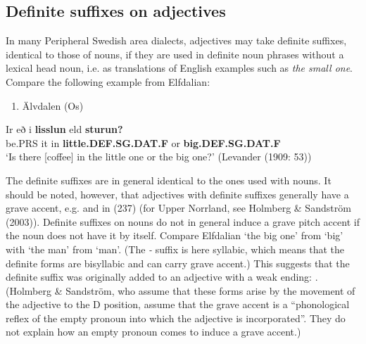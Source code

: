 \subsection[Definite suffixes on adjectives]{\rmfamily Definite suffixes on adjectives}
\label{bkm:Ref155519944}%
In many Peripheral Swedish area dialects, adjectives may take definite suffixes, identical to those of nouns, if they are used in definite noun phrases without a lexical head noun, i.e. as translations of English examples such as \textit{the small one}. Compare the following example from Elfdalian:

\begin{enumerate} %
\item 
\label{bkm:Ref78439135}Älvdalen (Os)

\end{enumerate} %
\ea\label{}
\gll Ir  eð  i  \textbf{lisslun} eld  \textbf{sturun?}\\


be.PRS  it  in  \textbf{little.DEF.SG.DAT.F} or  \textbf{big.DEF.SG.DAT.F}\\ %


‘Is there [coffee] in the little one or the big one?’ (Levander (1909: 53))
\z

The definite suffixes are in general identical to the ones used with nouns. It should be noted, however, that adjectives with definite suffixes generally have a grave accent, e.g.  and  in (237) (for Upper Norrland, see Holmberg \& Sandström (2003)). Definite suffixes on nouns do not in general induce a grave pitch accent if the noun does not have it by itself. Compare Elfdalian  ‘the big one’ from  ‘big’ with  ‘the man’ from  ‘man’. (The\textit{ {}-} suffix is here syllabic, which means that the definite forms are bisyllabic and can carry grave accent.) This suggests that the definite suffix was originally added to an adjective with a weak ending: . (Holmberg \& Sandström, who assume that these forms arise by the movement of the adjective to the D position, assume that the grave accent is a “phonological reflex of the empty pronoun into which the adjective is incorporated”. They do not explain how an empty pronoun comes to induce a grave accent.) 


